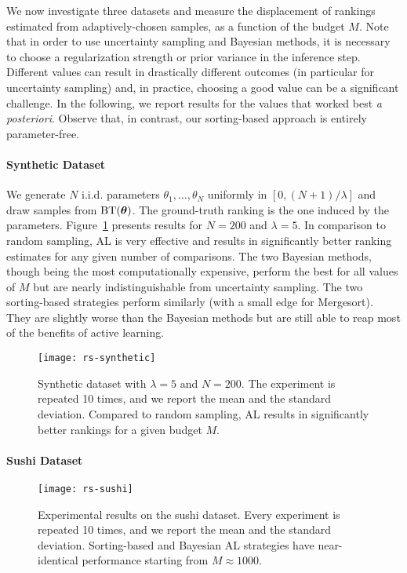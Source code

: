We now investigate three datasets and measure the displacement of rankings estimated from adaptively-chosen samples, as a function of the budget $M$.
Note that in order to use uncertainty sampling and Bayesian methods, it is necessary to choose a regularization strength or prior variance in the inference step.
Different values can result in drastically different outcomes (in particular for uncertainty sampling) and, in practice, choosing a good value can be a significant challenge.
In the following, we report results for the values that worked best \emph{a posteriori}.
Observe that, in contrast, our sorting-based approach is entirely parameter-free.


\paragraph{Synthetic Dataset}

We generate $N$ i.i.d. parameters $\theta_1, \ldots, \theta_N$ uniformly in $[0, (N\!+\!1) / \lambda]$ and draw samples from $\operatorname{BT}(\bm{\theta})$.
The ground-truth ranking is the one induced by the parameters.
Figure~\ref{rs:fig:synthetic} presents results for $N = \num{200}$ and $\lambda = \num{5}$.
In comparison to random sampling, AL is very effective and results in significantly better ranking estimates for any given number of comparisons.
The two Bayesian methods, though being the most computationally expensive, perform the best for all values of $M$ but are nearly indistinguishable from uncertainty sampling.
The two sorting-based strategies perform similarly (with a small edge for Mergesort).
They are slightly worse than the Bayesian methods but are still able to reap most of the benefits of active learning.

\begin{figure}
\centering
\texttt{[image: rs-synthetic]}
\caption{
Synthetic dataset with $\lambda = 5$ and $N = 200$.
The experiment is repeated \num{10} times, and we report the mean and the standard deviation.
Compared to random sampling, AL results in significantly better rankings for a given budget $M$.
}
\label{rs:fig:synthetic}
\end{figure}


\paragraph{Sushi Dataset}

\begin{figure}
\centering
\texttt{[image: rs-sushi]}
\caption{
Experimental results on the sushi dataset.
Every experiment is repeated \num{10} times, and we report the mean and the standard deviation.
Sorting-based and Bayesian AL strategies have near-identical performance starting from $M \approx \num{1000}$.
}
\label{rs:fig:sushi}
\end{figure}

